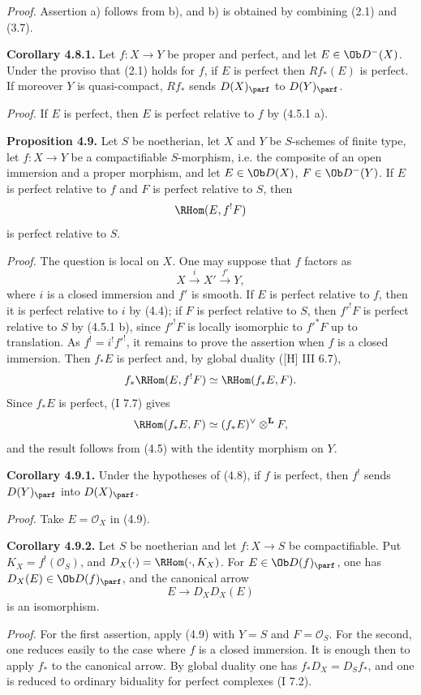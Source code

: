 \emph{Proof.} Assertion a) follows from b), and b) is obtained by combining (2.1) and (3.7).

\textbf{Corollary 4.8.1.} Let \(f:X\to Y\) be proper and perfect, and let \(E\in\Ob D^{-}(X)\). Under the proviso that (2.1) holds for \(f\), if \(E\) is perfect then \(Rf_*(E)\) is perfect. If moreover \(Y\) is quasi-compact, \(Rf_*\) sends \(D(X)_{\parf}\) to \(D(Y)_{\parf}\).

\emph{Proof.} If \(E\) is perfect, then \(E\) is perfect relative to \(f\) by (4.5.1 a).

\textbf{Proposition 4.9.} Let \(S\) be noetherian, let \(X\) and \(Y\) be \(S\)-schemes of finite type, let \(f:X\to Y\) be a compactifiable \(S\)-morphism, i.e. the composite of an open immersion and a proper morphism, and let \(E\in\Ob D(X)\), \(F\in\Ob D^{-}(Y)\). If \(E\) is perfect relative to \(f\) and \(F\) is perfect relative to \(S\), then
\[
 \RHom(E,f^!F)
\]
is perfect relative to \(S\).

\emph{Proof.} The question is local on \(X\). One may suppose that \(f\) factors as
\[
 X\xrightarrow{i}X'\xrightarrow{f'}Y,
\]
where \(i\) is a closed immersion and \(f'\) is smooth. If \(E\) is perfect relative to \(f\), then it is perfect relative to \(i\) by (4.4); if \(F\) is perfect relative to \(S\), then \(f'^!F\) is perfect relative to \(S\) by (4.5.1 b), since \(f'^!F\) is locally isomorphic to \(f'^*F\) up to translation. As \(f^!=i^!f'^!\), it remains to prove the assertion when \(f\) is a closed immersion. Then \(f_*E\) is perfect and, by global duality ([H] III 6.7),
\[
 f_*\RHom(E,f^!F)\simeq\RHom(f_*E,F).
\]
Since \(f_*E\) is perfect, (I 7.7) gives
\[
 \RHom(f_*E,F)\simeq(f_*E)^{\vee}\otimes^{\mathbf L}F,
\]
and the result follows from (4.5) with the identity morphism on \(Y\).

\textbf{Corollary 4.9.1.} Under the hypotheses of (4.8), if \(f\) is perfect, then \(f^!\) sends \(D(Y)_{\parf}\) into \(D(X)_{\parf}\).

\emph{Proof.} Take \(E=\mathcal O_X\) in (4.9).

\textbf{Corollary 4.9.2.} Let \(S\) be noetherian and let \(f:X\to S\) be compactifiable. Put \(K_X=f^!(\mathcal O_S)\), and \(D_X(\cdot)=\RHom(\cdot,K_X)\). For \(E\in\Ob D(f)_{\parf}\), one has \(D_X(E)\in\Ob D(f)_{\parf}\), and the canonical arrow
\[
 E\longrightarrow D_XD_X(E)
\]
is an isomorphism.

\emph{Proof.} For the first assertion, apply (4.9) with \(Y=S\) and \(F=\mathcal O_S\). For the second, one reduces easily to the case where \(f\) is a closed immersion. It is enough then to apply \(f_*\) to the canonical arrow. By global duality one has \(f_*D_X=D_Sf_*\), and one is reduced to ordinary biduality for perfect complexes (I 7.2).

